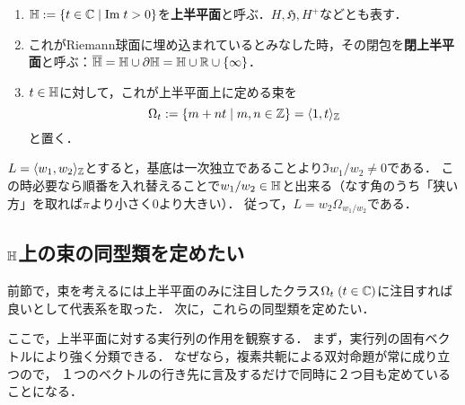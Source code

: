 \documentclass[uplatex, 12pt, dvipdfmx]{jsreport}
\begin{document}
\begin{definition}\mbox{}
    \begin{enumerate}
        \item $\mathbb{H}:=\{t\in\mathbb{C}\mid \mathrm{Im}\; t>0\}$を\textbf{上半平面}と呼ぶ．$H,\mathfrak{H},H^+$などとも表す．
        \item これがRiemann球面に埋め込まれているとみなした時，その閉包を\textbf{閉上半平面}と呼ぶ：$\overline{\mathbb{H}}=\mathbb{H}\cup\partial\mathbb{H}=\mathbb{H}\cup\mathbb{R}\cup\{\infty\}$．
        \item $t\in\mathbb{H}$に対して，これが上半平面上に定める束を
        \[ \Omega_t:=\{m+nt\mid m,n\in\mathbb{Z}\}=\langle 1,t\rangle_{\mathbb{Z}} \]
        と置く．
    \end{enumerate}
\end{definition}
\begin{remark}[上半平面に注目すれば良い理由]
    $L=\langle w_1,w_2\rangle_{\mathbb{Z}}$とすると，基底は一次独立であることより$\Im w_1/w_2\ne 0$である．
    この時必要なら順番を入れ替えることで$w_1/w_2\in\mathbb{H}$と出来る（なす角のうち「狭い方」を取れば$\pi$より小さく$0$より大きい）．
    従って，$L=w_2\Omega_{w_1/w_2}$である．
\end{remark}

\subsection{$\mathbb{H}$上の束の同型類を定めたい}

\begin{screen}
    前節で，束を考えるには上半平面のみに注目したクラス$\Omega_t\;(t\in\mathbb{C})$に注目すれば良いとして代表系を取った．
    次に，これらの同型類を定めたい．
\end{screen}

ここで，上半平面に対する実行列の作用を観察する．
まず，実行列の固有ベクトルにより強く分類できる．
なぜなら，複素共軛による双対命題が常に成り立つので，
１つのベクトルの行き先に言及するだけで同時に２つ目も定めていることになる．
\end{document}
